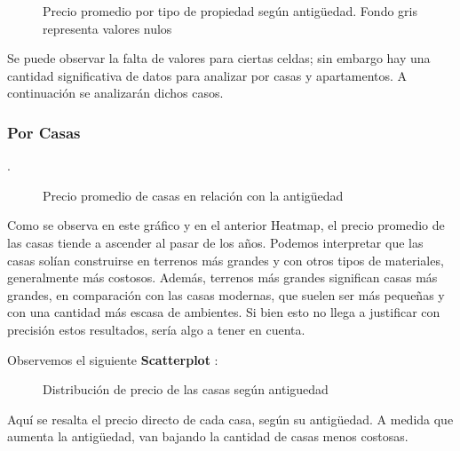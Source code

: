 \documentclass[
10pt, %
a4paper, %
oneside, %
headinclude,footinclude, %
BCOR5mm, %
]{scrartcl}
\begin{document}
    \begin{figure}[H]
         \caption{Precio promedio por tipo de propiedad según antigüedad. Fondo gris representa valores nulos}
         \label{fig:precio-propiedad-antiguedad}
    \end{figure}
    
    Se puede observar la falta de valores para ciertas celdas; sin embargo hay una cantidad significativa de datos para analizar por casas y apartamentos. A continuación se analizarán dichos casos.
    
    \subsubsection{Por Casas}.
        \begin{figure}[H]
            \caption{Precio promedio de casas en relación con la antigüedad}
             \label{fig:precio-casa-antiguedad-reg}
        \end{figure}
        
        Como se observa en este gráfico y en el anterior Heatmap, el precio promedio de las casas tiende a ascender al pasar de los años. 
        Podemos interpretar que las casas solían construirse en terrenos más grandes y con otros tipos de materiales, generalmente más costosos. Además, terrenos más grandes significan casas más grandes, en comparación con las casas modernas, que suelen ser más pequeñas y con una cantidad más escasa de ambientes. Si bien esto no llega a justificar con precisión estos resultados, sería algo a tener en cuenta.
        
        Observemos el siguiente \textbf{Scatterplot} :
        
        \begin{figure}[H]
            \caption{Distribución de precio de las casas según antiguedad}
             \label{fig:precio-casa-antiguedad-scatt}
        \end{figure}
        
        Aquí se resalta el precio directo de cada casa, según su antigüedad. A medida que aumenta la antigüedad, van bajando la cantidad de casas menos costosas.
        
\end{document}
